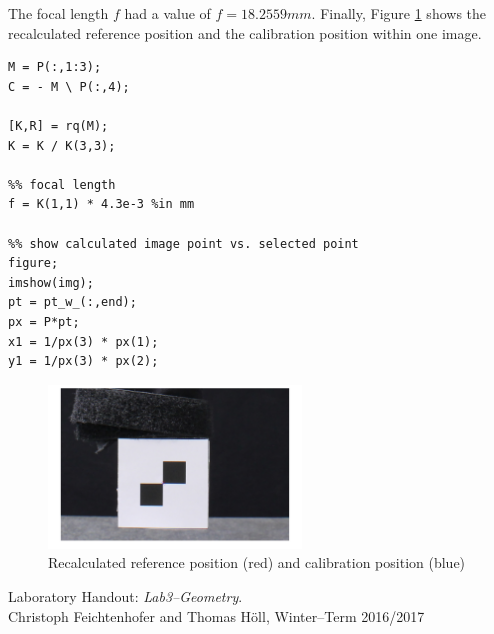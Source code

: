 \documentclass[
a4paper,     %
11pt         %
]{scrartcl}  %
\begin{document}
The focal length $f$ had a value of $f = 18.2559mm$.
Finally, Figure \ref{fig:camPro_recalc} shows the recalculated reference position and the calibration position within one image.

\begin{lstlisting}[label=lst:krc, caption=Matlab script to determine $\mathbf{K}\, \mathbf{R}$ and $\mathbf{C}$ ]
M = P(:,1:3);
C = - M \ P(:,4);

[K,R] = rq(M);
K = K / K(3,3);

%% focal length
f = K(1,1) * 4.3e-3 %in mm

%% show calculated image point vs. selected point
figure;
imshow(img);
pt = pt_w_(:,end);
px = P*pt;
x1 = 1/px(3) * px(1);
y1 = 1/px(3) * px(2);
\end{lstlisting}





\begin{figure}[ht]
 \centering
 \includegraphics[width=0.6\textwidth,clip,trim=10cm 5cm 15cm 15cm]{ccm_recalculated.png}
 \caption{Recalculated reference position (red) and calibration position (blue)}
 \label{fig:camPro_recalc}
\end{figure}

\begin{thebibliography}{XX}
  Laboratory Handout: \textit{Lab3--Geometry}. \\
    Christoph Feichtenhofer and Thomas Höll, Winter--Term 2016/2017
\end{thebibliography}
\end{document}
